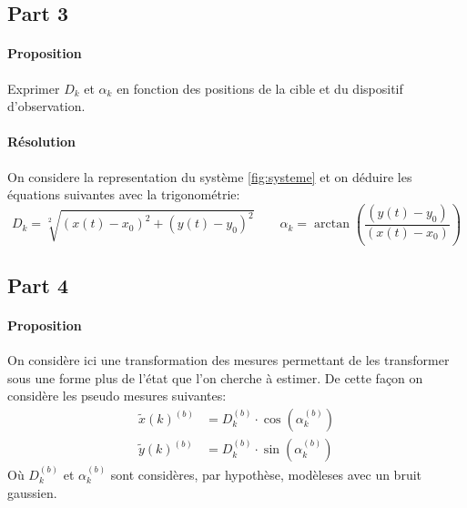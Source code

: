 \documentclass{article}
\begin{document}
\subsection{Part 3}
\paragraph{Proposition}Exprimer $D_k$ et $\alpha_k$ en fonction des positions de la cible et du dispositif d'observation.

\paragraph{Résolution}On considere la representation du système \ref{fig:systeme} et on déduire les équations suivantes avec la trigonométrie:
\begin{equation}
    \boxed{D_{k} = \sqrt[2]{(x(t) - x_{0})^2 + (y(t) - y_{0})^2}}
    \qquad
    \boxed{\alpha_{k} = \arctan\left( \frac{(y(t) - y_{0})}{(x(t) - x_{0})} \right)}
\end{equation}
\subsection{Part 4}
\paragraph{Proposition}On considère ici une transformation des mesures permettant de les transformer sous une forme plus de l'état que l'on cherche à estimer. De cette façon on considère les pseudo mesures suivantes:
\begin{align*}
    \tilde{x}(k)^{(b)} &= D_{k}^{(b)} \cdot \cos(\alpha_{k}^{(b)})\\
    \tilde{y}(k)^{(b)} &= D_{k}^{(b)} \cdot \sin(\alpha_{k}^{(b)})
\end{align*}
Où $D_{k}^{(b)}$ et $\alpha_{k}^{(b)}$ sont considères, par hypothèse, modèleses avec un bruit gaussien.
\end{document}
